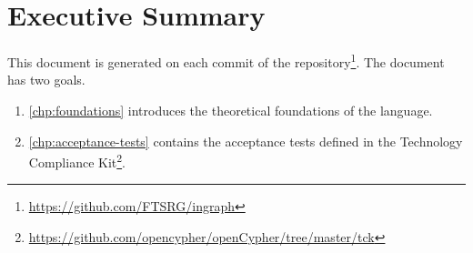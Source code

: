 \chapter*{Executive Summary}
\label{chp:executive-summary}

This document is generated on each commit of the \ingraph repository\footnote{\url{https://github.com/FTSRG/ingraph}}. The document has two goals.

\begin{enumerate}
	\item \cref{chp:foundations} introduces the theoretical foundations of the \opencypher language.
	\item \cref{chp:acceptance-tests} contains the acceptance tests defined in the \opencypher Technology Compliance Kit\footnote{\url{https://github.com/opencypher/openCypher/tree/master/tck}}.
\end{enumerate}
